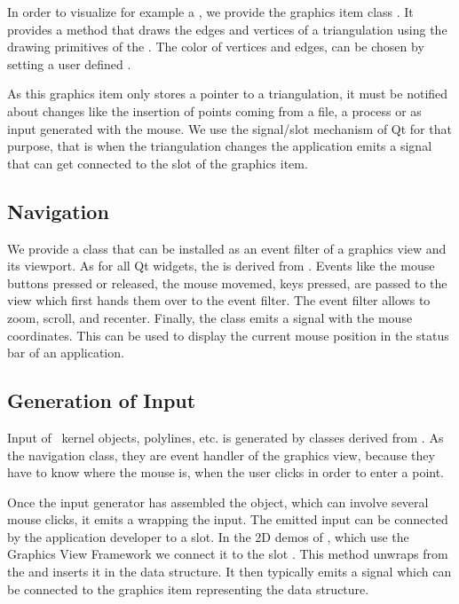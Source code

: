 In order to visualize for example a , we
provide the graphics item class .
It provides a  method that draws the edges and vertices of a triangulation
using the drawing primitives of the .   The color of vertices and edges, 
can be chosen by setting a user defined  .


As this graphics item only stores a pointer to a triangulation, it
must be notified about changes like the insertion of points coming from
a file, a process or as input generated with the mouse.  We
use the signal/slot mechanism of Qt for that purpose, that is when the
triangulation changes the application emits a signal that can get connected to the
 slot of the graphics item.



\subsection{Navigation}

We provide a class  that can be
installed as an event filter of a graphics view and its viewport. As for
all Qt widgets, the  is derived from
. Events like the  mouse buttons pressed or released, the mouse movemed, keys pressed, 
are passed to the view which first hands them over to the
event filter.  The  event filter allows to zoom, scroll, and recenter.
Finally, the class emits a signal with the mouse coordinates. This can be used
to display the current mouse position in the status bar of an application.

\subsection{Generation of Input}

Input of \cgal\ kernel objects, polylines, etc. is generated by classes derived
from .  As the navigation class, they are event handler of the
graphics view, because they have to know where the mouse is, when the user clicks
in order to enter a point.

Once the input generator has assembled the object, which can involve several mouse clicks,
it emits a  wrapping the input.  The emitted input can be connected
by the application developer to a slot. In the 2D demos of \cgal, which use the 
Graphics View Framework we connect it to the slot .
This method unwraps from the  and inserts it in the data structure. 
It then typically emits a signal  which can be 
connected to the graphics item representing the data structure.

